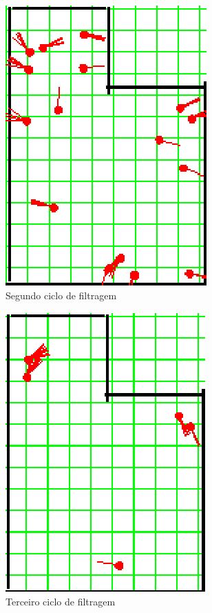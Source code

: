 \begin{figure}[H]
  \centering
  \includegraphics[scale=1]{figuras/cen3_ex4/3.eps}
  \caption[Segundo Ciclo de Filtragem]{Segundo ciclo de filtragem}
  \label{img:cen3_ex4_3}
\end{figure}

\begin{figure}[H]
  \centering
  \includegraphics[scale=1]{figuras/cen3_ex4/4.eps}
  \caption[Terceiro Ciclo de Filtragem]{Terceiro ciclo de filtragem}
  \label{img:cen3_ex4_4}
\end{figure}

